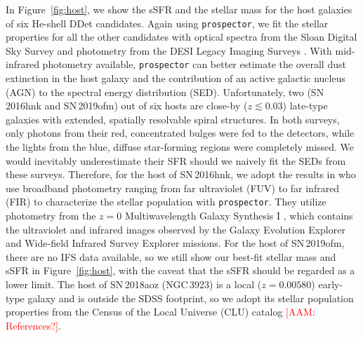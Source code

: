 \documentclass[twocolumn]{aastex631}
\newcommand{\adam}[1]{\textcolor{red}{[AAM: #1]}}
\begin{document}
In Figure~\ref{fig:host}, we show the sSFR and the stellar mass for the host galaxies of six He-shell DDet candidates. Again using \texttt{prospector}, we fit the stellar properties for all the other candidates with optical spectra from the Sloan Digital Sky Survey \citep[SDSS;][]{York_2000} and photometry from the DESI Legacy Imaging Surveys \citep[][{\it g, r, z, $W_1$, $W_2$, $W_3$, $W_4$} magnitudes]{Dey_2019}. With mid-infrared photometry available, \texttt{prospector} can better estimate the overall dust extinction in the host galaxy and the contribution of an active galactic nucleus (AGN) to the spectral energy distribution (SED). Unfortunately, two (SN\,2016hnk and SN\,2019ofm) out of six hosts are close-by ($z\lesssim 0.03$) late-type galaxies with extended, spatially resolvable spiral structures. In both surveys, only photons from their red, concentrated bulges were fed to the detectors, while the lights from the blue, diffuse star-forming regions were completely missed. We would inevitably underestimate their SFR should we naively fit the SEDs from these surveys. Therefore, for the host of SN\,2016hnk, 
we adopt the results in \citet{Dong_Ca-rich_2022} who use broadband photometry ranging from far ultraviolet (FUV) to far infrared (FIR) to characterize the stellar population with \texttt{prospector}. They utilize photometry from the $z=0$ Multiwavelength Galaxy Synthesis I \citep[z0MGS;][]{Leroy_2019}, which contains the ultraviolet and infrared images observed by the Galaxy Evolution Explorer \citep[GALEX;][]{GALEX_2005} and Wide-field Infrared Survey Explorer \citep[WISE;][]{WISE_2010} missions.
For the host of SN\,2019ofm, there are no IFS data available, so we still show our best-fit stellar mass and sSFR in Figure~\ref{fig:host}, with the caveat that the sSFR should be regarded as a lower limit. The host of SN\,2018aoz (NGC\,3923) is a local ($z=0.00580$) early-type galaxy and is outside the SDSS footprint, so we adopt its stellar population properties from the Census of the Local Universe (CLU) catalog \adam{References?}.
\end{document}
